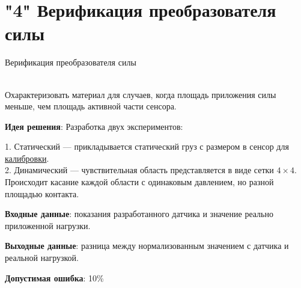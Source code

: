\documentclass[aspectratio=169,xcolor=table,10pt]{beamer}
\begin{document}
\section{"4" Верификация преобразователя силы}

\begin{frame}[t]{Верификация преобразователя силы}
\framesubtitle{}
\begin{columns}[T,onlytextwidth]
\begin{column}{0.69\textwidth}
    \small
    Охарактеризовать материал для случаев, когда площадь приложения силы меньше, чем площадь активной части сенсора.

    \textbf{Идея решения}: Разработка двух экспериментов: 
    
    1. Статический --- прикладывается статический груз с размером в сенсор для \underline{калибровки}.\\
    2. Динамический --- чувствительная область представляется в виде сетки $4\times4$. Происходит касание каждой области с одинаковым давлением, но разной площадью контакта.

    \textbf{Входные данные}: показания разработанного датчика и значение реально приложенной нагрузки.

    \textbf{Выходные данные}: разница между нормализованным значением с датчика и реальной нагрузкой.

    \textbf{Допустимая ошибка}: 10\%


\end{column}
\end{columns}
\end{frame}
\end{document}
